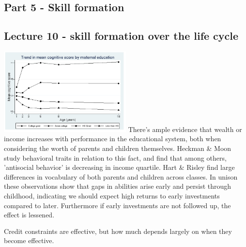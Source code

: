 \documentclass[12pt, a4paper]{article}
\begin{document}
\begin{multicols}{2}
\section{Part 5 - Skill formation}
\subsection{Lecture 10 - skill formation over the life cycle}
\includegraphics[width = 0.5\textwidth]{mateduc.jpg}
There's ample evidence that wealth or income increases with performance in the educational system, both when considering the worth of parents and children themselves. Heckman \& Moon study behavioral traits in relation to this fact, and find that among others, 'antisocial behavior' is decreasing in income quartile. Hart \& Risley find large differences in vocabulary of both parents and children across classes. In unison these observations show that gaps in abilities arise early and persist through childhood, indicating we should expect high returns to early investments compared to later. Furthermore if early investments are not followed up, the effect is lessened.

Credit constraints are effective, but how much depends largely on when they become effective.


\end{multicols}
\end{document}
